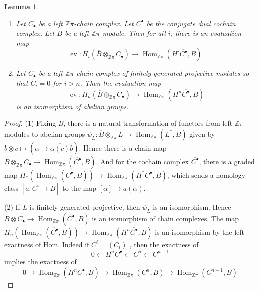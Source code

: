 \documentclass[12pt]{amsart}
\newtheorem{lemma}[theorem]{Lemma}
\theoremstyle{definition}
\newcommand{\Z}{\mathbb Z}
\DeclareMathOperator{\ev}{ev}
\DeclareMathOperator{\Hom}{Hom}
\newcommand{\ol}[1]{{\overline{#1}}}
\begin{document}

\begin{lemma} \label{evaluation lemma}
\begin{enumerate}

\item Let $C_\bullet$ be a left $\Z\pi$-chain complex.  Let $\ol{C^\bullet}$ be the conjugate dual cochain complex.   Let $B$ be a left $\Z\pi$-module.   Then for all $i$,  there is an evaluation map 
$$
\ev: H_i(\ol B \otimes_{\Z\pi}  C_\bullet)  \to \Hom_{\Z\pi}(H^i\ol{C^\bullet},B ).
$$

\item Let $C_\bullet$ be a left $\Z\pi$-chain complex of finitely generated projective modules so that $C_i = 0$ for $i > n$.   Then the evaluation map 
$$
\ev: H_n(\ol B \otimes_{\Z\pi}  C_\bullet)  \to \Hom_{\Z\pi}(H^n\ol{C^\bullet},B )
$$
 is an isomorphism of abelian groups.
\end{enumerate}
\end{lemma}

\begin{proof}
(1) Fixing $B$, there is a natural transformation of functors from left $\Z\pi$-modules to abelian groups $\psi_L : \ol B \otimes_{\Z\pi} L\to \Hom_{\Z\pi}(L^*,B )$ given by $b \otimes c  \mapsto (\alpha \mapsto \ol {\alpha(c)}b)$.  
%
Hence there is a chain map $\ol B \otimes_{\Z\pi} C_\bullet \to \Hom_{\Z\pi}(\ol{C^\bullet}, B)$.  And for the cochain complex $\ol{C^{\bullet}}$, there is a graded map $H_*(\Hom_{\Z\pi}(\ol{C^\bullet}, B)) \to \Hom_{\Z\pi}(H^*\ol{C^\bullet},B)$, which sends a homology class $[a: C^i \to B]$ to the map $[\alpha] \mapsto a(\alpha)$.

(2) If $L$ is finitely generated projective, then $\psi_L$ is an isomorphism.  Hence $\ol B \otimes C_\bullet \to \Hom_{\Z\pi}(\ol{C^\bullet}, B)$ is an isomorphism of chain complexes.  The map  $H_n( \Hom_{\Z\pi}(\ol{C^\bullet}, B))  \to \Hom_{\Z\pi}(H^n\ol{C^\bullet},B )$ is an isomorphism by the left exactness of Hom. Indeed if $C^{i} = (C_{i})^{\dagger}$, then the exactness of 
$$
0 \leftarrow H^{n}\ol{C^{\bullet}} \leftarrow C^{n} \leftarrow C^{n-1}
$$
implies the exactness of 
$$
0 \to \Hom_{\Z\pi}( H^{n}\ol{C^{\bullet}},B) \to \Hom_{\Z\pi}( C^{n},B) \to \Hom_{\Z\pi}( C^{n-1},B)
$$
\end{proof}
\end{document}

